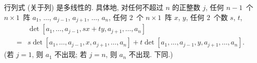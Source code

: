 \documentclass[../libro.tex]{subfiles}
\begin{document}

\begin{theorem}[多线性]
    行列式 (关于列) 是多线性的.
    具体地, 对任何不超过 \(n\) 的正整数 \(j\),
    任何 \(n-1\)~个 \(n \times 1\)~阵
    \(a_1\), \(\dots\), \(a_{j-1}\),
    \(a_{j+1}\), \(\dots\), \(a_n\),
    任何 \(2\)~个 \(n \times 1\)~阵 \(x\), \(y\),
    任何 \(2\)~个数 \(s\), \(t\),
    \begin{align*}
        &
        \det {[a_1, \dots, a_{j-1}, sx + ty, a_{j+1}, \dots, a_n]}
        \\
        = {} &
        s \det {[a_1, \dots, a_{j-1}, x, a_{j+1}, \dots, a_n]}
        + t \det {[a_1, \dots, a_{j-1}, y, a_{j+1}, \dots, a_n]}.
    \end{align*}
    (若 \(j = 1\), 则 \(a_1\) 不出现; %
    若 \(j = n\), 则 \(a_n\) 不出现.
    下同.) %
\end{theorem}
\end{document}
